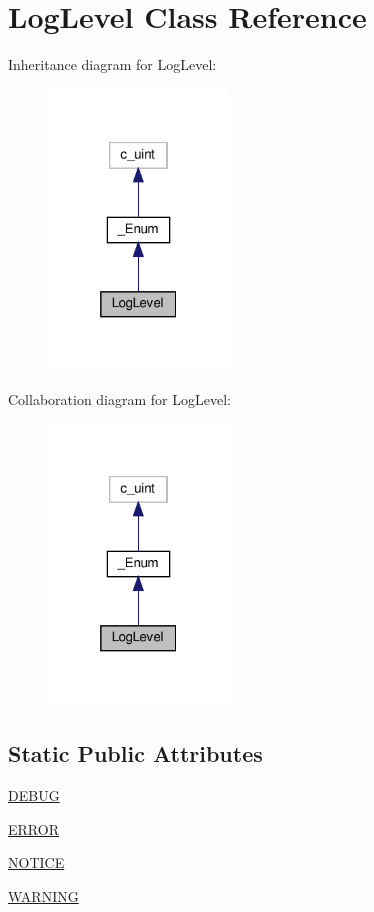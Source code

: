 \hypertarget{classvlc_1_1_log_level}{}\section{Log\+Level Class Reference}
\label{classvlc_1_1_log_level}


Inheritance diagram for Log\+Level\+:
\nopagebreak
\begin{figure}[H]
\begin{center}
\leavevmode
\includegraphics[width=136pt]{classvlc_1_1_log_level__inherit__graph}
\end{center}
\end{figure}


Collaboration diagram for Log\+Level\+:
\nopagebreak
\begin{figure}[H]
\begin{center}
\leavevmode
\includegraphics[width=136pt]{classvlc_1_1_log_level__coll__graph}
\end{center}
\end{figure}
\subsection*{Static Public Attributes}
\begin{DoxyCompactItemize}
\item 
\hyperlink{classvlc_1_1_log_level_a73585d7121de037cf2e2ca12b27eb83e}{D\+E\+B\+UG}
\item 
\hyperlink{classvlc_1_1_log_level_a9eaada089c4de774cfc8b7aea4b9379a}{E\+R\+R\+OR}
\item 
\hyperlink{classvlc_1_1_log_level_a2aa2edea3dd2f76f785d9500d6437322}{N\+O\+T\+I\+CE}
\item 
\hyperlink{classvlc_1_1_log_level_a1dfc73ab73898d3f4f348d462a5d126a}{W\+A\+R\+N\+I\+NG}
\end{DoxyCompactItemize}
